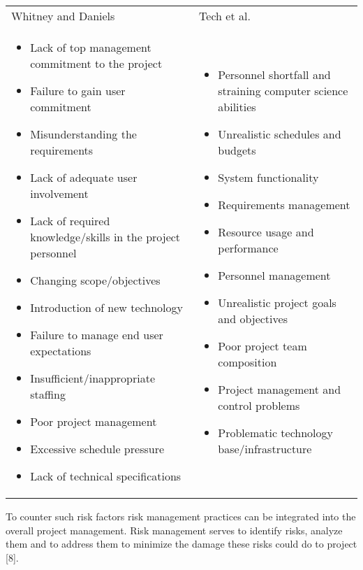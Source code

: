 \begin{table}[H]
	\centering
	\begin{tabular}{p{}p{}}
	Whitney and Daniels  & Tech et al. \\
	\begin{itemize}	\item	Lack of top management commitment to the project	
		\item	Failure to gain user commitment	
		\item	Misunderstanding the requirements	
		\item	Lack of adequate user involvement	
		\item	 Lack of required knowledge/skills in the project personnel	
		\item	Changing scope/objectives	
		\item	Introduction of new technology	
		\item	Failure to manage end user expectations	
		\item	Insufficient/inappropriate staffing	
		\item	Poor project management	
		\item	Excessive schedule pressure	
		\item	Lack of technical specifications	\end{itemize}
		&
		\begin{itemize}	\item	 Personnel shortfall and straining computer science abilities	
			\item	Unrealistic schedules and budgets	
			\item	System functionality	
			\item	Requirements management	
			\item	Resource usage and performance	
			\item	Personnel management	
			\item	Unrealistic project goals and objectives	
			\item	 Poor project team composition	
			\item	 Project management and control problems	
			\item	Problematic technology base/infrastructure		 
		\end{itemize}	
		\end{tabular}
\end{table}
To counter such risk factors risk management practices can be integrated into the overall project management. Risk management serves to identify risks, analyze them and to address them to minimize the damage these risks could do to project [8]. \\

